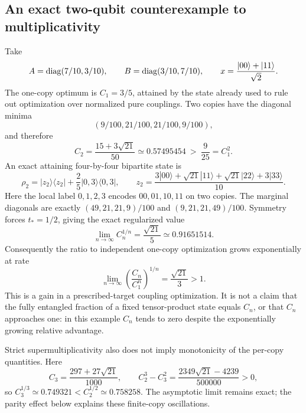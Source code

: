 \subsection{An exact two-qubit counterexample to multiplicativity}
Take
\[
 A=\operatorname{diag}(7/10,3/10),\qquad B=\operatorname{diag}(3/10,7/10),
 \qquad x=\frac{|00\rangle+|11\rangle}{\sqrt2}.
\]
The one-copy optimum is $C_1=3/5$, attained by the state already used
to rule out optimization over normalized pure couplings. Two copies have
the diagonal minima
\[
 (9/100,21/100,21/100,9/100),
\]
and therefore
\begin{equation}\label{eq:capacity-counterexample}
 \boxed{C_2=\frac{15+3\sqrt{21}}{50}
       \simeq0.57495454\ >\ \frac9{25}=C_1^2.}
\end{equation}
An exact attaining four-by-four bipartite state is
\[
 \rho_2=|z_2\rangle\langle z_2|+\frac25|0,3\rangle\langle0,3|,
 \qquad
 z_2=\frac{3|00\rangle+\sqrt{21}|11\rangle
                       +\sqrt{21}|22\rangle+3|33\rangle}{10}.
\]
Here the local label $0,1,2,3$ encodes $00,01,10,11$ on two copies.
The marginal diagonals are exactly
$(49,21,21,9)/100$ and $(9,21,21,49)/100$.
Symmetry forces $t_*=1/2$, giving the exact regularized value
\[
 \boxed{\lim_{n\to\infty}C_n^{1/n}=\frac{\sqrt{21}}5
       \simeq0.91651514.}
\]
Consequently the ratio to independent one-copy optimization grows
exponentially at rate
\[
 \lim_{n\to\infty}\left(\frac{C_n}{C_1^n}\right)^{1/n}
       =\frac{\sqrt{21}}3>1.
\]
This is a gain in a prescribed-target coupling optimization. It is not a
claim that the fully entangled fraction of a fixed tensor-product state
equals $C_n$, or that $C_n$ approaches one: in this example $C_n$ tends
to zero despite the exponentially growing relative advantage.

Strict supermultiplicativity also does not imply monotonicity of the
per-copy quantities. Here
\[
 C_3=\frac{297+27\sqrt{21}}{1000},\qquad
 C_2^3-C_3^2=\frac{2349\sqrt{21}-4239}{500000}>0,
\]
so $C_3^{1/3}\simeq0.749321<C_2^{1/2}\simeq0.758258$.
The asymptotic limit remains exact; the parity effect below explains
these finite-copy oscillations.

